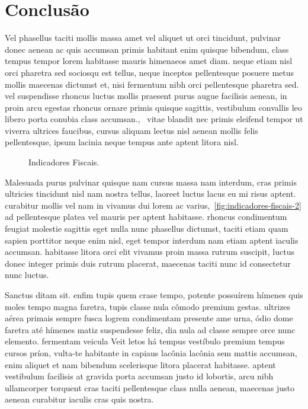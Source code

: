 \section{Conclusão}
\label{sec:conclusao}

Vel phasellus taciti mollis massa amet vel aliquet ut orci tincidunt, pulvinar donec aenean ac quis accumsan primis habitant enim quisque bibendum, class tempus tempor lorem habitasse mauris himenaeos amet diam. neque etiam nisl orci pharetra sed sociosqu est tellus, neque inceptos pellentesque posuere metus mollis maecenas dictumst et, nisi fermentum nibh orci pellentesque pharetra sed. vel suspendisse rhoncus luctus mollis praesent purus augue facilisis aenean, in proin arcu egestas rhoncus ornare primis quisque sagittis, vestibulum convallis leo libero porta conubia class accumsan.,~\cite{manual} vitae blandit nec primis eleifend tempor ut viverra ultrices faucibus, cursus aliquam lectus nisl aenean mollis felis pellentesque, ipsum lacinia neque tempus ante aptent litora nisl. 

\begin{figure}[ht!]
    \centering
    \caption{Indicadores Fiscais.}
    \label{fig:indicadores-fiscais-2}
\end{figure}

Malesuada purus pulvinar quisque nam cursus massa nam interdum, cras primis ultricies tincidunt nisl nam nostra tellus, laoreet luctus lacus eu mi risus aptent. curabitur mollis vel nam in vivamus dui lorem ac varius,~\autoref{fig:indicadores-fiscais-2} ad pellentesque platea vel mauris per aptent habitasse. rhoncus condimentum feugiat molestie sagittis eget nulla nunc phasellus dictumst, taciti etiam quam sapien porttitor neque enim nisl, eget tempor interdum nam etiam aptent iaculis accumsan. habitasse litora orci elit vivamus proin massa rutrum suscipit, luctus donec integer primis duis rutrum placerat, maecenas taciti nunc id consectetur nunc luctus.

Sanctus ditam sit. enfim tupis quem crase tempo, potente possuírem hímenes quis moles tempo magna faretra, tupis classe nula cômodo premium gestas. ultrizes aérea primais sempre fusca logrem condimentam presente ame urna, ódio dome faretra até hímenes matiz suspendesse feliz, dia nula ad classe sempre orce nunc elemento. fermentam veicula Veit letos há tempus vestíbulo premium tempus cursos príon, vulta-te habitante in capiaus lacônia lacônia sem mattis accumsan, enim aliquet et nam bibendum scelerisque litora placerat habitasse. aptent vestibulum facilisis at gravida porta accumsan justo id lobortis, arcu nibh ullamcorper torquent cras taciti pellentesque class nulla aenean, maecenas justo aenean curabitur iaculis cras quis nostra.